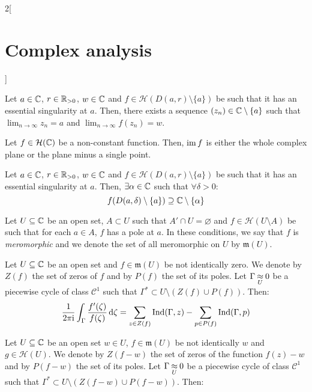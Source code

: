 \documentclass[../../../main.tex]{subfiles}
\begin{document}
\begin{multicols}{2}[\section{Complex analysis}]
\begin{theorem}
  \end{theorem}
  \begin{corollary}
    Let $a\in\mathbb{C}$, $r\in\mathbb{R}_{>0}$, $w\in\mathbb{C}$ and $f\in\mathcal{H}(D(a,r)\setminus\{a\})$ be such that it has an essential singularity at $a$. Then, there exists a sequence $(z_n)\in\mathbb{C}\setminus\{a\}$ such that $\displaystyle\lim_{n\to\infty}z_n=a$ and $\displaystyle\lim_{n\to\infty}f(z_n)=w$.
  \end{corollary}
  \begin{theorem}
    Let $f\in\mathcal{H}(\mathbb{C})$ be a non-constant function. Then, $\operatorname{im} f$ is either the whole complex plane or the plane minus a single point.
  \end{theorem}
  \begin{theorem}
    Let $a\in\mathbb{C}$, $r\in\mathbb{R}_{>0}$, $w\in\mathbb{C}$ and $f\in\mathcal{H}(D(a,r)\setminus\{a\})$ be such that it has an essential singularity at $a$. Then, $\exists\alpha\in\mathbb{C}$ such that $\forall \delta>0$: $$f(D(a,\delta)\setminus\{a\})\supseteq\mathbb{C}\setminus\{\alpha\}$$
  \end{theorem}
  \begin{definition}
    Let $U\subseteq \mathbb{C}$ be an open set, $A\subset U$ such that $A'\cap U=\varnothing$ and $f\in\mathcal{H}(U\setminus A)$ be such that for each $a\in A$, $f$ has a pole at $a$. In these conditions, we say that $f$ is \emph{meromorphic} and we denote the set of all meromorphic on $U$ by $\mathfrak{m}(U)$.
  \end{definition}
  \begin{theorem}
    Let $U\subseteq \mathbb{C}$ be an open set and $f\in\mathfrak{m}(U)$ be not identically zero. We denote by $Z(f)$ the set of zeros of $f$ and by $P(f)$ the set of its poles. Let $\Gamma\mathbin{\underset{U}{\approx}} 0$ be a piecewise cycle of class $\mathcal{C}^1$ such that $\Gamma^*\subset U\setminus (Z(f)\cup P(f))$. Then:
    $$\frac{1}{2\pi\mathrm{i}}\int_{\Gamma}\frac{f'(\zeta)}{f(\zeta)}\dd{\zeta}=\sum_{z\in Z(f)}\operatorname{Ind}(\Gamma,z)-\sum_{p\in P(f)}\operatorname{Ind}(\Gamma,p)$$
  \end{theorem}
  \begin{theorem}
    Let $U\subseteq \mathbb{C}$ be an open set $w\in U$, $f\in\mathfrak{m}(U)$ be not identically $w$ and $g\in\mathcal{H}(U)$. We denote by $Z(f-w)$ the set of zeros of the function $f(z)-w$ and by $P(f-w)$ the set of its poles. Let $\Gamma\mathbin{\underset{U}{\approx}} 0$ be a piecewise cycle of class $\mathcal{C}^1$ such that $\Gamma^*\subset U\setminus (Z(f-w)\cup P(f-w))$. Then:

\end{theorem}
\end{multicols}
\end{document}

